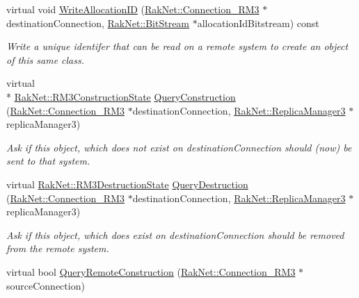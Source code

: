 \begin{DoxyCompactItemize}
\item 
virtual void \hyperlink{class_rak_net_1_1_replica3_composite_a7a05709ac67f8261dd5e3293c4374d3a}{Write\-Allocation\-I\-D} (\hyperlink{class_rak_net_1_1_connection___r_m3}{Rak\-Net\-::\-Connection\-\_\-\-R\-M3} $\ast$destination\-Connection, \hyperlink{class_rak_net_1_1_bit_stream}{Rak\-Net\-::\-Bit\-Stream} $\ast$allocation\-Id\-Bitstream) const 
\begin{DoxyCompactList}\small\item\em Write a unique identifer that can be read on a remote system to create an object of this same class. \end{DoxyCompactList}\item 
virtual \\*
\hyperlink{group___r_e_p_l_i_c_a___m_a_n_a_g_e_r___g_r_o_u_p3_ga16aaecf3c23582f0de6652b348ccfa38}{Rak\-Net\-::\-R\-M3\-Construction\-State} \hyperlink{class_rak_net_1_1_replica3_composite_a28ba2a4669eb1f6c5a0b1d6eec31848c}{Query\-Construction} (\hyperlink{class_rak_net_1_1_connection___r_m3}{Rak\-Net\-::\-Connection\-\_\-\-R\-M3} $\ast$destination\-Connection, \hyperlink{class_rak_net_1_1_replica_manager3}{Rak\-Net\-::\-Replica\-Manager3} $\ast$replica\-Manager3)
\begin{DoxyCompactList}\small\item\em Ask if this object, which does not exist on {\itshape destination\-Connection} should (now) be sent to that system. \end{DoxyCompactList}\item 
virtual \hyperlink{group___r_e_p_l_i_c_a___m_a_n_a_g_e_r___g_r_o_u_p3_ga400c157a937f062bd8a3c19a49d33541}{Rak\-Net\-::\-R\-M3\-Destruction\-State} \hyperlink{class_rak_net_1_1_replica3_composite_a6072ff772d5eff7c73e6f6e5b8e00ac3}{Query\-Destruction} (\hyperlink{class_rak_net_1_1_connection___r_m3}{Rak\-Net\-::\-Connection\-\_\-\-R\-M3} $\ast$destination\-Connection, \hyperlink{class_rak_net_1_1_replica_manager3}{Rak\-Net\-::\-Replica\-Manager3} $\ast$replica\-Manager3)
\begin{DoxyCompactList}\small\item\em Ask if this object, which does exist on {\itshape destination\-Connection} should be removed from the remote system. \end{DoxyCompactList}\item 
virtual bool \hyperlink{class_rak_net_1_1_replica3_composite_ae5f099064ed5168d7bb180aec8ca2eb5}{Query\-Remote\-Construction} (\hyperlink{class_rak_net_1_1_connection___r_m3}{Rak\-Net\-::\-Connection\-\_\-\-R\-M3} $\ast$source\-Connection)

\end{DoxyCompactItemize}
